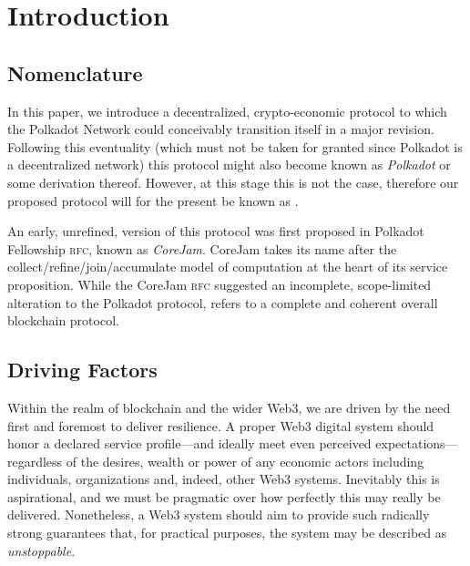 \section{Introduction}

\subsection{Nomenclature}


In this paper, we introduce a decentralized, crypto-economic protocol to which the Polkadot Network could conceivably transition itself in a major revision. Following this eventuality (which must not be taken for granted since Polkadot is a decentralized network) this protocol might also become known as \emph{Polkadot} or some derivation thereof. However, at this stage this is not the case, therefore our proposed protocol will for the present be known as \Jam.

An early, unrefined, version of this protocol was first proposed in Polkadot Fellowship \textsc{rfc}, known as \emph{CoreJam}. CoreJam takes its name after the collect/refine/join/accumulate model of computation at the heart of its service proposition. While the CoreJam \textsc{rfc} suggested an incomplete, scope-limited alteration to the Polkadot protocol, \Jam refers to a complete and coherent overall blockchain protocol.

\subsection{Driving Factors}

Within the realm of blockchain and the wider Web3, we are driven by the need first and foremost to deliver resilience. A proper Web3 digital system should honor a declared service profile---and ideally meet even perceived expectations---regardless of the desires, wealth or power of any economic actors including individuals, organizations and, indeed, other Web3 systems. Inevitably this is aspirational, and we must be pragmatic over how perfectly this may really be delivered. Nonetheless, a Web3 system should aim to provide such radically strong guarantees that, for practical purposes, the system may be described as \emph{unstoppable}.

